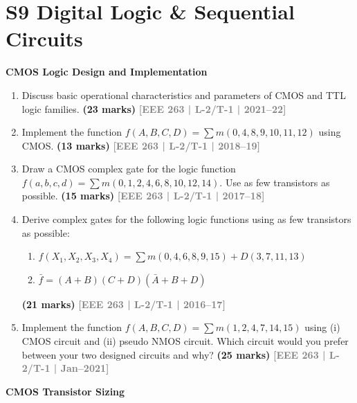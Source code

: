 \documentclass[12pt,a3paper]{article}
\newcommand{\yr}[1]{\hfill\textcolor{gray}{\small\textbf{[#1]}}}
\newcommand{\mk}[1]{\textcolor{orange!70!black}{\small\textbf{(#1 marks)}}}
\newcommand{\subtopic}[2]{%
  \vspace{10pt}
  \noindent\begin{tcolorbox}[colback=#1!8,colframe=#1,boxrule=0.6pt,arc=4pt,
    left=6pt,right=6pt,top=4pt,bottom=4pt]
    \small\bfseries\textcolor{#1}{#2}
  \end{tcolorbox}
  \vspace{2pt}
}
\begin{document}
\section*{S9 \quad Digital Logic \& Sequential Circuits}

\subtopic{cD}{CMOS Logic Design and Implementation}
\label{sub:s9-cmos}

\begin{enumerate}\item Discuss basic operational characteristics and parameters of CMOS and TTL logic families.
\mk{23} \yr{EEE 263 | L-2/T-1 | 2021--22}

\item Implement the function $f(A,B,C,D)=\sum m(0,4,8,9,10,11,12)$ using CMOS.
\mk{13} \yr{EEE 263 | L-2/T-1 | 2018--19}

\item Draw a CMOS complex gate for the logic function $f(a,b,c,d)=\sum m(0,1,2,4,6,8,10,12,14)$. Use as few transistors as possible.
\mk{15} \yr{EEE 263 | L-2/T-1 | 2017--18}

\item Derive complex gates for the following logic functions using as few transistors as possible:
\begin{enumerate}
  \item $f(X_1,X_2,X_3,X_4)=\sum m(0,4,6,8,9,15)+D(3,7,11,13)$
  \item $\bar{f}=(A+B)(C+D)(\bar{A}+B+D)$
\end{enumerate}
\mk{21} \yr{EEE 263 | L-2/T-1 | 2016--17}

\item Implement the function $f(A,B,C,D)=\sum m(1,2,4,7,14,15)$ using (i) CMOS circuit and (ii) pseudo NMOS circuit. Which circuit would you prefer between your two designed circuits and why?
\mk{25} \yr{EEE 263 | L-2/T-1 | Jan--2021}

\end{enumerate}

\subtopic{cD}{CMOS Transistor Sizing}
\label{sub:s9-sizing}
\end{document}
